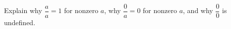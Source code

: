 Explain why $\dfrac{a}{a}=1$ for nonzero $a$, why $\dfrac{0}{a}=0$ for nonzero $a$, and why $\dfrac{0}{0}$ is undefined.
